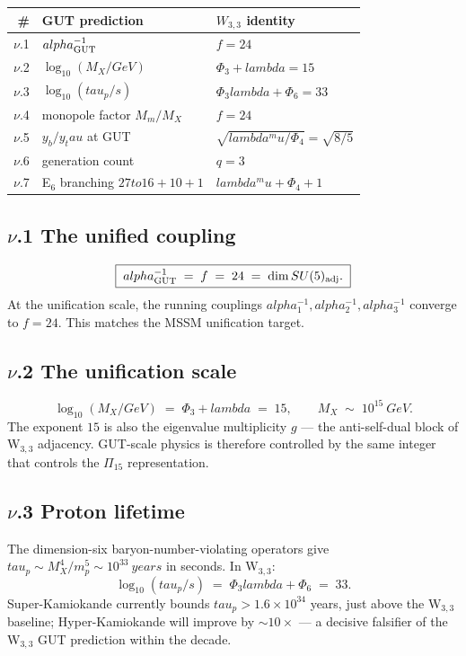\documentclass[12pt,a4paper]{article}
\def\mathrm#1{#1}%
\def\mathbf#1{#1}%
\def\textbf#1{#1}%
\def\text#1{#1}%
\def\alpha{alpha}%
\def\lambda{lambda}%
\def\mu{mu}%
\def\Phi#1{Phi#1}%
\def\tau{tau}%
\def\to{ to }%
\theoremstyle{definition}
\newcommand{\SU}{\mathrm{SU}}
\begin{document}
\begin{center}
\renewcommand{\arraystretch}{1.4}
\begin{tabular}{rll}
\toprule
\# & GUT prediction & $W_{3,3}$ identity \\
\midrule
$\nu$.1 & $\alpha_{\rm GUT}^{-1}$ & $f = 24$ \\
$\nu$.2 & $\log_{10}(M_X / \text{GeV})$ & $\Phi_3 + \lambda = 15$ \\
$\nu$.3 & $\log_{10}(\tau_p / \text{s})$ & $\Phi_3\lambda + \Phi_6 = 33$ \\
$\nu$.4 & monopole factor $M_m / M_X$ & $f = 24$ \\
$\nu$.5 & $y_b / y_\tau$ at GUT & $\sqrt{\lambda^\mu/\Phi_4} = \sqrt{8/5}$ \\
$\nu$.6 & generation count & $q = 3$ \\
$\nu$.7 & E$_6$ branching $\mathbf{27} \to \mathbf{16}+\mathbf{10}+\mathbf{1}$ & $\lambda^\mu + \Phi_4 + 1$ \\
\bottomrule
\end{tabular}
\end{center}

\subsection*{$\nu$.1 \quad The unified coupling}
\[
\boxed{\;\alpha_{\rm GUT}^{-1} \;=\; f \;=\; 24 \;=\; \dim\SU(5)_{\rm adj}.\;}
\]
At the unification scale, the running couplings
$\alpha_1^{-1}, \alpha_2^{-1}, \alpha_3^{-1}$ converge to $f = 24$.
This matches the MSSM unification target.

\subsection*{$\nu$.2 \quad The unification scale}
\[
\log_{10}(M_X / \text{GeV}) \;=\; \Phi_3 + \lambda \;=\; 15,
\qquad M_X \;\sim\; 10^{15}\ \text{GeV}.
\]
The exponent $15$ is also the eigenvalue multiplicity $g$ — the
anti-self-dual block of W$_{3,3}$ adjacency. GUT-scale physics is
therefore controlled by the same integer that controls the
$\Pi_{15}$ representation.

\subsection*{$\nu$.3 \quad Proton lifetime}
The dimension-six baryon-number-violating operators give
$\tau_p \sim M_X^4 / m_p^5 \sim 10^{33}\ \text{years}$ in seconds. In W$_{3,3}$:
\[
\log_{10}(\tau_p / \text{s}) \;=\; \Phi_3\lambda + \Phi_6 \;=\; 33.
\]
Super-Kamiokande currently bounds $\tau_p > 1.6\times 10^{34}$ years,
just above the W$_{3,3}$ baseline; Hyper-Kamiokande will improve by
$\sim 10\times$ — \textbf{a decisive falsifier} of the W$_{3,3}$ GUT
prediction within the decade.
\end{document}

